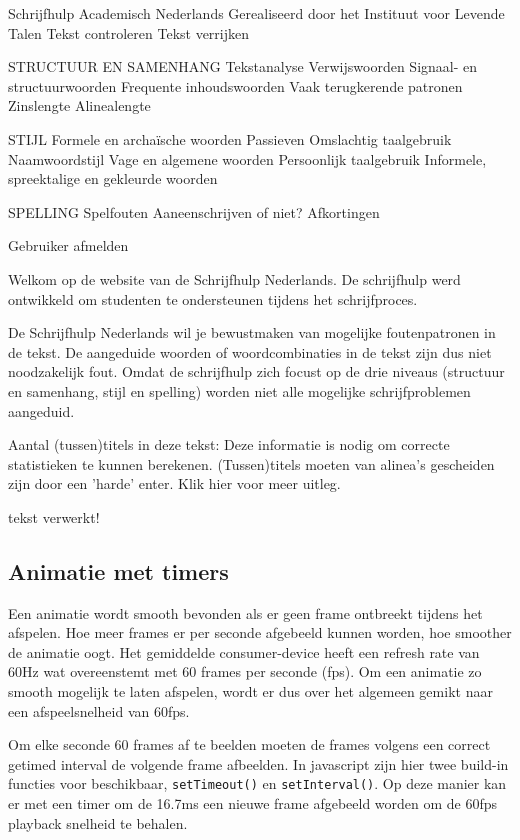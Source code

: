 
Schrijfhulp Academisch Nederlands
Gerealiseerd door het Instituut voor Levende Talen
Tekst
controleren
Tekst
verrijken

STRUCTUUR EN SAMENHANG
Tekstanalyse
Verwijswoorden
Signaal- en structuurwoorden
Frequente inhoudswoorden
Vaak terugkerende patronen
Zinslengte
Alinealengte

STIJL
Formele en archaïsche woorden
Passieven
Omslachtig taalgebruik
Naamwoordstijl
Vage en algemene woorden
Persoonlijk taalgebruik
Informele, spreektalige en gekleurde woorden

SPELLING
Spelfouten
Aaneenschrijven of niet?
Afkortingen


Gebruiker afmelden

Welkom op de website van de Schrijfhulp Nederlands. De schrijfhulp werd ontwikkeld om studenten te ondersteunen tijdens het schrijfproces.

De Schrijfhulp Nederlands wil je bewustmaken van mogelijke foutenpatronen in de tekst. De aangeduide woorden of woordcombinaties in de tekst zijn dus niet noodzakelijk fout. Omdat de schrijfhulp zich focust op de drie niveaus (structuur en samenhang, stijl en spelling) worden niet alle mogelijke schrijfproblemen aangeduid.

Aantal (tussen)titels in deze tekst:
Deze informatie is nodig om correcte statistieken te kunnen berekenen.
(Tussen)titels moeten van alinea’s gescheiden zijn door een 'harde' enter. Klik hier voor meer uitleg.

tekst verwerkt!

\subsection{Animatie met timers}

Een animatie wordt smooth bevonden als er geen frame ontbreekt tijdens het afspelen. Hoe meer frames er per seconde afgebeeld kunnen worden, hoe smoother de animatie oogt. Het gemiddelde consumer-device heeft een refresh rate van 60Hz wat overeenstemt met 60 frames per seconde (fps). Om een animatie zo smooth mogelijk te laten afspelen, wordt er dus over het algemeen gemikt naar een afspeelsnelheid van 60fps.

Om elke seconde 60 frames af te beelden moeten de frames volgens een correct getimed interval de volgende frame afbeelden. In javascript zijn hier twee build-in functies voor beschikbaar, \texttt{setTimeout()} en \texttt{setInterval()}. Op deze manier kan er met een timer om de 16.7ms een nieuwe frame afgebeeld worden om de 60fps playback snelheid te behalen.

